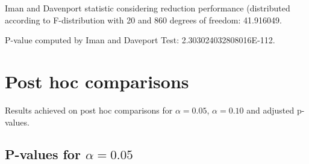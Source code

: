 \documentclass[a4paper,10pt]{article}
\begin{document}
\begin{landscape}
Iman and Davenport statistic considering reduction performance (distributed according to F-distribution with 20 and 860 degrees of freedom: 41.916049.

P-value computed by Iman and Daveport Test: 2.303024032808016E-112.\newline



\pagebreak

\section{Post hoc comparisons}

Results achieved on post hoc comparisons for $\alpha = 0.05$, $\alpha = 0.10$ and adjusted p-values.

\subsection{P-values for $\alpha=0.05$}


\end{landscape}
\end{document}
